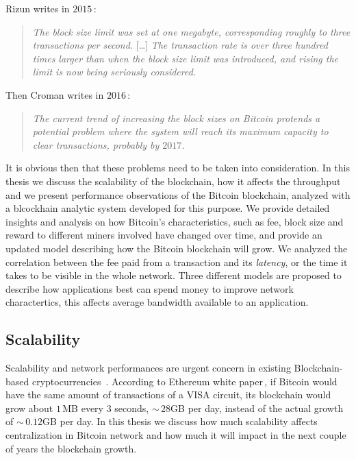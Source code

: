 \documentclass[USenglish]{uit-thesis}
\begin{document}
Rizun writes in $2015$\,\cite{Rizun:2015:blocksizelimit}:
\begin{quote}
	\emph{The block size limit was set at one megabyte, corresponding
		roughly to three transactions per second.}
		[\dots]
		\emph{The transaction rate is over three hundred times larger
		than when the block size limit was introduced, and rising the limit
		is now being seriously considered.}
\end{quote}
Then Croman writes in $2016$\,\cite{croman2016}:
\begin{quote}
\emph{The current trend of increasing the block sizes on Bitcoin protends
a potential problem where the system will reach its maximum capacity to clear
transactions, probably by $2017$.}
\end{quote}

It is obvious then that these problems need to be taken
into consideration.
In this thesis we discuss the scalability of the blockchain, how it affects
the throughput and we present performance observations of the
Bitcoin blockchain, analyzed with a blcockhain analytic system developed
for this purpose. We provide detailed insights and analysis on how
Bitcoin's characteristics, such as fee, block size and reward to different
miners involved have changed over time, and provide an
updated model describing how the Bitcoin blockchain will grow. 
We analyzed the correlation between the fee paid from a transaction
and its \emph{latency}, or the time it takes to 
be visible in the whole network.
Three different models are proposed to describe how applications
best can spend money to improve network charactertics,
this affects average bandwidth available to an application. 

\subsection{Scalability}
\label{sec:prob_stat_scalability}
Scalability and network performances are urgent
concern in existing Blockchain-based
cryptocurrencies~\cite{croman2016}.
According to Ethereum white paper\,\cite{ethereum_white_paper},
if Bitcoin would have the same amount of transactions
of a VISA circuit, its blockchain would grow
about $1$\,MB every $3$ seconds, $\sim$\,$28$GB per day,
instead of the actual growth of $\sim$\,$0.12$GB per day.
In this thesis we discuss how much scalability affects
centralization in Bitcoin network and how much it will
impact in the next couple of years the blockchain
growth.
\end{document}
